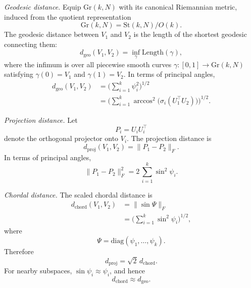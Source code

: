 \documentclass[11pt,letterpaper]{article}
\newcommand{\gr}{\mathrm{Gr}}
\begin{document}
\noindent
\textit{Geodesic distance.} Equip $\gr(k,N)$ with its canonical Riemannian metric, induced from the quotient representation
\begin{equation*}
\gr(k,N)=\mathrm{St}(k,N)/O(k).
\end{equation*}
The geodesic distance between $V_1$ and $V_2$ is the length of the shortest geodesic connecting them:
\begin{equation}
\label{eq:grass-dist-intrinsic}
d_{\mathrm{geo}}(V_1,V_2)=\inf_{\gamma}\mathrm{Length}(\gamma),
\end{equation}
where the infimum is over all piecewise smooth curves $\gamma:[0,1]\to\gr(k,N)$ satisfying $\gamma(0)=V_1$ and $\gamma(1)=V_2$. In terms of principal angles,
\begin{equation}
\label{eq:grass-dist-theta}
\begin{split}
d_{\mathrm{geo}}(V_1,V_2)&=\Big(\sum_{i=1}^k \psi_i^2\Big)^{1/2}\\
&=\Big(\sum_{i=1}^k \arccos^2\big(\sigma_i(U_1^\top U_2)\big) \Big)^{1/2}.
\end{split}
\end{equation}

\noindent
\textit{Projection distance.} Let
\begin{equation*}
P_i=U_iU_i^\top
\end{equation*}
denote the orthogonal projector onto $V_i$. The projection distance is
\begin{equation}
\label{eq:proj-dist}
d_{\mathrm{proj}}(V_1,V_2) = \|P_1-P_2\|_F .
\end{equation}
In terms of principal angles,
\begin{equation}
\label{eq:proj-theta}
\|P_1-P_2\|_F^2 = 2\,\sum_{i=1}^k \sin^2\psi_i .
\end{equation}

\noindent
\textit{Chordal distance.} The scaled chordal distance is
\begin{equation}
\label{eq:chordal-dist}
\begin{split}
d_{\mathrm{chord}}(V_1,V_2) &= \|\sin\Psi\|_F\\
&=\Big(\sum_{i=1}^k \sin^2\psi_i\Big)^{1/2},
\end{split}
\end{equation}
where
\begin{equation*}
\Psi=\mathrm{diag}(\psi_1,\ldots,\psi_k).
\end{equation*}
Therefore
\begin{equation}
\label{eq:projection-chordal-relation}
d_{\mathrm{proj}}=\sqrt{2}\,d_{\mathrm{chord}}.
\end{equation}
For nearby subspaces, $\sin\psi_i\approx \psi_i$, and hence
\begin{equation}
\label{eq:local-distance-equivalence}
d_{\mathrm{chord}}\approx d_{\mathrm{geo}}.
\end{equation}
\end{document}
